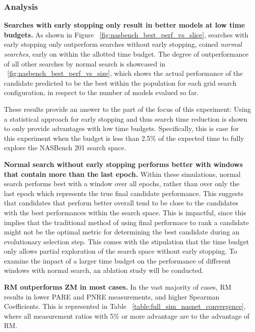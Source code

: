 \documentclass[twocolumn]{article}
\begin{document}
\subsubsection{Analysis}

\textbf{Searches with early stopping only result in better models at low time budgets.}
As shown in Figure ~\ref{fig:nasbench_best_perf_vs_slice}, searches with early stopping only outperform searches without early stopping, coined \emph{normal searches},
early on within the allotted time budget. The degree of outperformance of all other searches by normal search is showcased in ~\ref{fig:nasbench_best_perf_vs_size}, 
which shows the actual performance of the candidate predicted to be the best within the population for each grid search configuration,
in respect to the number of models evalued so far.

These results provide an answer to the part of the focus of this experiment: Using a statistical approach for early stopping and thus search time reduction
is shown to only provide advantages with low time budgets.
Specifically, this is case for this experiment when the budget is less than 2.5\% of the expected time to fully explore the NASBench 201 search space.

\textbf{Normal search without early stopping performs better with windows that contain more than the last epoch.}
Within these simulations, normal search performs best with a window over all epochs, rather than over only the last epoch which represents the true final candidate performance.
This suggests that candidates that perform better overall tend to be close to the candidates with the best performances within the search space.
This is impactful, since this implies that the traditional method of using final performace to rank a candidate might not be the optimal
metric for determining the best candidate during an evolutionary selection step.
This comes with the stipulation that the time budget only allows partial exploration of the search space without early stopping.
To examine the impact of a larger time budget on the performance of different windows with normal search, an ablation study will be conducted.

\textbf{RM outperforms ZM in most cases.}
In the vast majority of cases, RM results in lower PARE and PNRE measurements, and higher Spearman Coefficients.
This is represented in Table ~\ref{table:full_sim_nasnet_convergence}, where all measurement ratios with 5\% or more advantage are to the advantage of RM.
\end{document}

